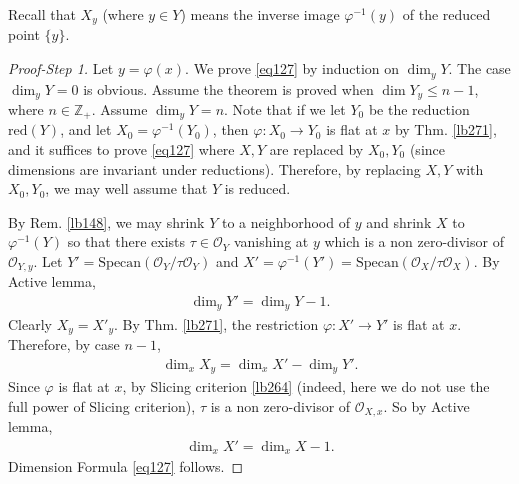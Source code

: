 \documentclass[12pt,b5paper,notitlepage]{report}
\theoremstyle{definition}
\theoremstyle{plain}
\newcommand{\scr}{\mathscr}
\newcommand{\Zbb}{\mathbb Z}
\newcommand{\Specan}{\mathrm{Specan}}
\newcommand{\red}{\mathrm{red}}
\numberwithin{equation}{section}
\begin{document}
Recall that $X_y$ (where $y\in Y$) means the inverse image $\varphi^{-1}(y)$ of the reduced point $\{y\}$.
\begin{proof}[Proof-Step 1]
Let $y=\varphi(x)$. We prove \eqref{eq127} by induction on $\dim_y Y$. The case $\dim_y Y=0$ is obvious. Assume the theorem is proved when $\dim Y_y\leq n-1$, where $n\in\Zbb_+$. Assume $\dim_y Y=n$. Note that if we let $Y_0$ be the reduction $\red(Y)$, and let $X_0=\varphi^{-1}(Y_0)$, then $\varphi:X_0\rightarrow Y_0$ is flat at $x$ by Thm. \ref{lb271}, and it suffices to prove \eqref{eq127} where $X,Y$ are replaced by $X_0,Y_0$ (since dimensions are invariant under reductions). Therefore, by replacing $X,Y$ with $X_0,Y_0$, we may well assume that $Y$ is reduced.

By Rem. \ref{lb148}, we may shrink $Y$ to a neighborhood of $y$ and shrink $X$ to $\varphi^{-1}(Y)$ so that there exists $\tau\in\scr O_Y$ vanishing at $y$ which is a non zero-divisor of $\scr O_{Y,y}$. Let $Y'=\Specan(\scr O_Y/\tau\scr O_Y)$ and $X'=\varphi^{-1}(Y')=\Specan(\scr O_X/\tau\scr O_X)$. By Active lemma, 
\begin{align*}
\dim_y Y'=\dim_yY-1.
\end{align*}
Clearly $X_y=X'_y$. By Thm. \ref{lb271}, the restriction $\varphi:X'\rightarrow Y'$ is flat at $x$. Therefore, by case $n-1$,
\begin{align*}
\dim_x X_y=\dim_x X'-\dim_yY'.
\end{align*}
Since $\varphi$ is flat at $x$, by Slicing criterion \ref{lb264} (indeed, here we do not use the full power of Slicing criterion), $\tau$ is a non zero-divisor of $\scr O_{X,x}$. So by Active lemma, 
\begin{align*}
\dim_xX'=\dim_x X-1.
\end{align*}
Dimension Formula \eqref{eq127} follows.
\end{proof}
\end{document}

